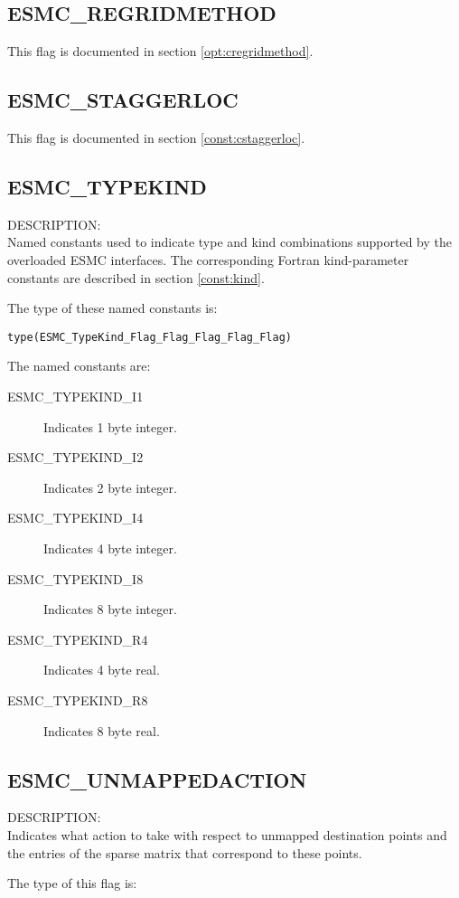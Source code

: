 \subsection{ESMC\_REGRIDMETHOD}
This flag is documented in section \ref{opt:cregridmethod}.

\subsection{ESMC\_STAGGERLOC}
This flag is documented in section \ref{const:cstaggerloc}.

\subsection{ESMC\_TYPEKIND}
\label{const:ctypekind}

{\sf DESCRIPTION:\\}
Named constants used to indicate type and kind combinations supported by the
overloaded ESMC interfaces. The corresponding Fortran kind-parameter constants
are described in section \ref{const:kind}.

The type of these named constants is:

{\tt type(ESMC\_TypeKind\_Flag\_Flag\_Flag\_Flag\_Flag)}

The named constants are:
\begin{description}
\item [ESMC\_TYPEKIND\_I1]
      Indicates 1 byte integer.
\item [ESMC\_TYPEKIND\_I2]
      Indicates 2 byte integer.
\item [ESMC\_TYPEKIND\_I4]
      Indicates 4 byte integer.
\item [ESMC\_TYPEKIND\_I8]
      Indicates 8 byte integer.
\item [ESMC\_TYPEKIND\_R4]
      Indicates 4 byte real.
\item [ESMC\_TYPEKIND\_R8]
      Indicates 8 byte real.
\end{description}

\subsection{ESMC\_UNMAPPEDACTION}
\label{const:unmappedaction}
{\sf DESCRIPTION:\\}
Indicates what action to take with respect to unmapped destination points
and the entries of the sparse matrix that correspond to these points.

The type of this flag is:

